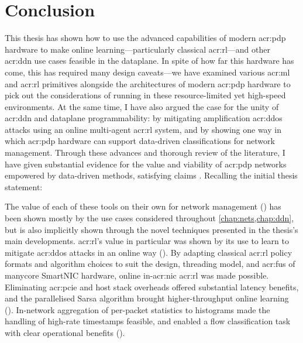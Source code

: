 \chapter{Conclusion}\label{chap:conclusion}
This thesis has shown how to use the advanced capabilities of modern \gls{acr:pdp} hardware to make online learning---particularly classical \gls{acr:rl}---and other \gls{acr:ddn} use cases feasible in the dataplane.
In spite of how far this hardware has come, this has required many design caveats---we have examined various \gls{acr:ml} and \gls{acr:rl} primitives alongside the architectures of modern \gls{acr:pdp} hardware to pick out the considerations of running in these resource-limited yet high-speed environments.
At the same time, I have also argued the case for the unity of \gls{acr:ddn} and dataplane programmability: by mitigating amplification \gls{acr:ddos} attacks using an online multi-agent \gls{acr:rl} system, and by showing one way in which \gls{acr:pdp} hardware can support data-driven classifications for network management.
%
Through these advances and thorough review of the literature, I have given substantial evidence for the value and viability of \gls{acr:pdp} networks empowered by data-driven methods, satisfying claims .
Recalling the initial thesis statement:
\begin{quotation}
	\noindent
\end{quotation}
The value of each of these tools on their own for network management () has been shown mostly by the use cases considered throughout \cref{chap:nets,chap:ddn}, but is also implicitly shown through the novel techniques presented in the thesis's main developments.
\gls{acr:rl}'s value in particular was shown by its use to learn to mitigate \gls{acr:ddos} attacks in an online way ().
By adapting classical \gls{acr:rl} policy formats and algorithm choices to suit the design, threading model, and \glspl{acr:fu} of manycore SmartNIC hardware, online in-\gls{acr:nic} \gls{acr:rl} was made possible.
Eliminating \gls{acr:pcie} and host stack overheads offered substantial latency benefits, and the parallelised Sarsa algorithm brought higher-throughput online learning ().
In-network aggregation of per-packet statistics to histograms made the handling of high-rate timestamps feasible, and enabled a flow classification task with clear operational benefits ().

